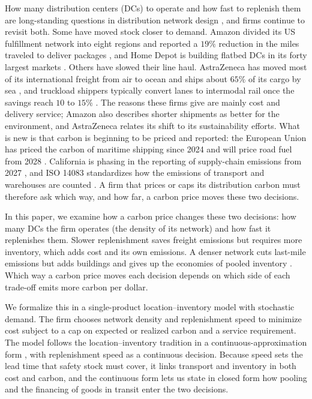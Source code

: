\documentclass[11pt]{article}
\numberwithin{proposition}{section}
\theoremstyle{definition}
\theoremstyle{remark}
\theoremstyle{plain}
\begin{document}
How many distribution centers (DCs) to operate and how fast to replenish them are long-standing questions in
distribution network design \citep{eppen1979effects, daskin2002inventory, shen2003joint}, and firms continue to
revisit both. Some have moved stock closer to demand. Amazon divided its US fulfillment network into eight
regions and reported a $19\%$ reduction in the miles traveled to deliver packages \citep{amazon2023q2}, and Home
Depot is building flatbed DCs in its forty largest markets \citep{homedepot2020fdc}. Others
have slowed their line haul. AstraZeneca has moved most of its international freight from air to ocean and ships
about $65\%$ of its cargo by sea \citep{pharmcommerce2023astrazeneca}, and truckload shippers typically convert
lanes to intermodal rail once the savings reach $10$ to $15\%$ \citep{freightwaves2026intermodal}. The reasons
these firms give are mainly cost and delivery service; Amazon also describes shorter shipments as better for the
environment, and AstraZeneca relates its shift to its sustainability efforts. What is new is that carbon is
beginning to be priced and reported:
the European Union has priced the carbon of maritime shipping since 2024 \citep{eu2023ets} and will price road
fuel from 2028 \citep{eea2026ets2}. California is phasing in the reporting of supply-chain emissions from 2027
\citep{california2023sb253}, and ISO 14083 standardizes how the emissions of transport and warehouses are
counted \citep{iso2023_14083}. A firm that prices or caps its distribution carbon must therefore ask which way, and how far, a carbon price
moves these two decisions.

In this paper, we examine how a carbon price changes these two decisions: how many DCs the firm operates (the
density of its network) and how fast it replenishes them. Slower replenishment saves freight emissions
\citep{psaraftis2013speed, cariou2011slow} but requires more inventory, which adds cost and its own emissions. A
denser network cuts last-mile emissions but adds buildings and gives up the economies of pooled inventory
\citep{eppen1979effects, mckinnon2012setting}. Which way a carbon price moves each decision depends on which side
of each trade-off emits more carbon per dollar.

We formalize this in a single-product location--inventory model with stochastic demand. The firm chooses network
density and replenishment speed to minimize cost subject to a cap on expected or realized carbon and a service requirement. The model follows the location--inventory tradition
\citep{daskin2002inventory, shen2003joint} in a continuous-approximation form \citep{daganzo2005logistics}, with
replenishment speed as a continuous decision. Because speed sets the lead time that safety stock must cover, it
links transport and inventory in both cost and carbon, and the continuous form lets us state in closed form how
pooling and the financing of goods in transit enter the two decisions.
\end{document}
